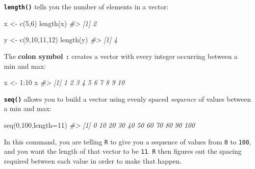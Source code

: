 \documentclass[
]{book}
\newenvironment{Shaded}{\begin{snugshade}}{\end{snugshade}}
\newcommand{\AttributeTok}[1]{\textcolor[rgb]{0.77,0.63,0.00}{#1}}
\newcommand{\CommentTok}[1]{\textcolor[rgb]{0.56,0.35,0.01}{\textit{#1}}}
\newcommand{\DecValTok}[1]{\textcolor[rgb]{0.00,0.00,0.81}{#1}}
\newcommand{\FunctionTok}[1]{\textcolor[rgb]{0.00,0.00,0.00}{#1}}
\newcommand{\NormalTok}[1]{#1}
\newcommand{\OtherTok}[1]{\textcolor[rgb]{0.56,0.35,0.01}{#1}}
\newcommand{\SpecialCharTok}[1]{\textcolor[rgb]{0.00,0.00,0.00}{#1}}
\begin{document}
\textbf{\texttt{length()}} tells you the number of elements in a vector:

\begin{Shaded}
\begin{Highlighting}[]
\NormalTok{x }\OtherTok{\textless{}{-}} \FunctionTok{c}\NormalTok{(}\DecValTok{5}\NormalTok{,}\DecValTok{6}\NormalTok{)}
\FunctionTok{length}\NormalTok{(x)}
\CommentTok{\#\textgreater{} [1] 2}
\end{Highlighting}
\end{Shaded}

\begin{Shaded}
\begin{Highlighting}[]
\NormalTok{y }\OtherTok{\textless{}{-}} \FunctionTok{c}\NormalTok{(}\DecValTok{9}\NormalTok{,}\DecValTok{10}\NormalTok{,}\DecValTok{11}\NormalTok{,}\DecValTok{12}\NormalTok{)}
\FunctionTok{length}\NormalTok{(y)}
\CommentTok{\#\textgreater{} [1] 4}
\end{Highlighting}
\end{Shaded}

The \textbf{colon symbol \texttt{:}} creates a vector with every integer occurring between a min and max:

\begin{Shaded}
\begin{Highlighting}[]
\NormalTok{x }\OtherTok{\textless{}{-}} \DecValTok{1}\SpecialCharTok{:}\DecValTok{10}
\NormalTok{x}
\CommentTok{\#\textgreater{}  [1]  1  2  3  4  5  6  7  8  9 10}
\end{Highlighting}
\end{Shaded}

\textbf{\texttt{seq()}} allows you to build a vector using evenly spaced \emph{sequence} of values between a min and max:

\begin{Shaded}
\begin{Highlighting}[]
\FunctionTok{seq}\NormalTok{(}\DecValTok{0}\NormalTok{,}\DecValTok{100}\NormalTok{,}\AttributeTok{length=}\DecValTok{11}\NormalTok{)}
\CommentTok{\#\textgreater{}  [1]   0  10  20  30  40  50  60  70  80  90 100}
\end{Highlighting}
\end{Shaded}

In this command, you are telling \texttt{R} to give you a sequence of values from \texttt{0} to \texttt{100}, and you want the length of that vector to be \texttt{11}. \texttt{R} then figures out the spacing required between each value in order to make that happen.
\end{document}
